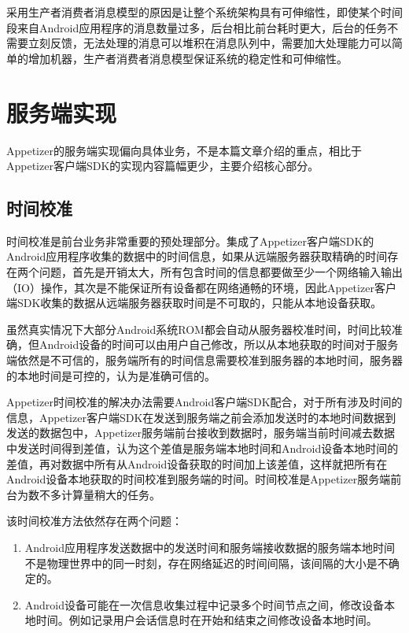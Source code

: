 采用生产者消费者消息模型的原因是让整个系统架构具有可伸缩性，即使某个时间段来自Android应用程序的消息数量过多，后台相比前台耗时更大，后台的任务不需要立刻反馈，无法处理的消息可以堆积在消息队列中，需要加大处理能力可以简单的增加机器，生产者消费者消息模型保证系统的稳定性和可伸缩性。

\section{服务端实现}

Appetizer的服务端实现偏向具体业务，不是本篇文章介绍的重点，相比于Appetizer客户端SDK的实现内容篇幅更少，主要介绍核心部分。

\subsection{时间校准}

时间校准是前台业务非常重要的预处理部分。集成了Appetizer客户端SDK的Android应用程序收集的数据中的时间信息，如果从远端服务器获取精确的时间存在两个问题，首先是开销太大，所有包含时间的信息都要做至少一个网络输入输出（IO）操作，其次是不能保证所有设备都在网络通畅的环境，因此Appetizer客户端SDK收集的数据从远端服务器获取时间是不可取的，只能从本地设备获取。

虽然真实情况下大部分Android系统ROM都会自动从服务器校准时间，时间比较准确，但Android设备的时间可以由用户自己修改，所以从本地获取的时间对于服务端依然是不可信的，服务端所有的时间信息需要校准到服务器的本地时间，服务器的本地时间是可控的，认为是准确可信的。

Appetizer时间校准的解决办法需要Android客户端SDK配合，对于所有涉及时间的信息，Appetizer客户端SDK在发送到服务端之前会添加发送时的本地时间数据到发送的数据包中，Appetizer服务端前台接收到数据时，服务端当前时间减去数据中发送时间得到差值，认为这个差值是服务端本地时间和Android设备本地时间的差值，再对数据中所有从Android设备获取的时间加上该差值，这样就把所有在Android设备本地获取的时间校准到服务端的时间。时间校准是Appetizer服务端前台为数不多计算量稍大的任务。

该时间校准方法依然存在两个问题：

\begin{enumerate}
	\item Android应用程序发送数据中的发送时间和服务端接收数据的服务端本地时间不是物理世界中的同一时刻，存在网络延迟的时间间隔，该间隔的大小是不确定的。
	\item Android设备可能在一次信息收集过程中记录多个时间节点之间，修改设备本地时间。例如记录用户会话信息时在开始和结束之间修改设备本地时间。
\end{enumerate} 

